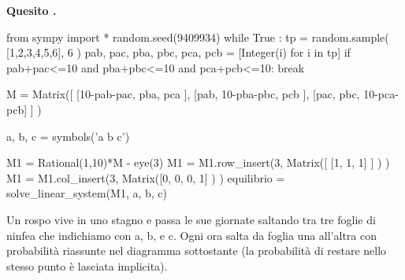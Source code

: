 \documentclass[11pt,twoside,a4paper]{article}
\def\Pr{{\rm Pr\,}}
\newcounter{quesito}
\newenvironment{question}{\bigskip\addtocounter{quesito}{1}\par\textbf{Quesito \thequesito.}}{\vspace{\parskip}}
\begin{document}
\clearpage
\begin{question}
\def\Pr{{\rm Pr\,}}
\def\pyl#1{\py{latex(#1) } }
\everymath{\displaystyle}
\def\nicefrac#1#2{#1/#2}
\renewcommand{\arraystretch}{1.3}
\begin{pycode}
from sympy import *
random.seed(9409934)
while True :
    tp  =  random.sample( [1,2,3,4,5,6], 6 ) 
    pab, pac, pba, pbc, pca, pcb = [Integer(i) for i in tp] 
    if pab+pac<=10 and pba+pbc<=10 and pca+pcb<=10: break
    
M = Matrix([ [10-pab-pac, pba,        pca       ],
             [pab,         10-pba-pbc, pcb       ],
             [pac,         pbc,        10-pca-pcb] ] )
    
a, b, c = symbols('a b c')

M1 = Rational(1,10)*M - eye(3)
M1 = M1.row_insert(3, Matrix([ [1, 1, 1] ] ) )
M1 = M1.col_insert(3, Matrix([0, 0, 0, 1] ) )
equilibrio = solve_linear_system(M1, a, b, c)

\end{pycode}
Un rospo vive in uno stagno e passa le sue giornate saltando tra tre foglie di ninfea che indichiamo con {\sf a}, {\sf b}, e {\sf c}. Ogni ora salta da foglia una all'altra con probabilità riassunte nel diagramma sottostante (la probabilità di restare nello stesso punto è lasciata implicita). 




\hfil
{}


\end{question}
\end{document}
